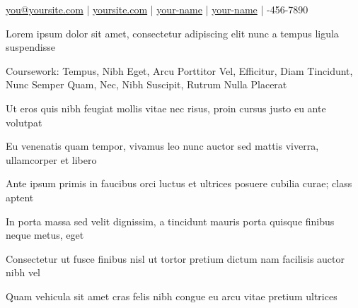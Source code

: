 \documentclass{resume-template}
\begin{document}

\begin{icons}
 \href{mailto:you@yoursite.com}{you@yoursite.com} | 
 \href{https://yoursite.com}{yoursite.com} |
 \href{https://linkedin.com/in/your-name/}{your-name} |
 \href{https://github.com/your-name}{your-name} |
-456-7890
\end{icons}



\begin{bullets}
\item Lorem ipsum dolor sit amet, consectetur adipiscing elit nunc a tempus ligula suspendisse
\item Coursework: Tempus, Nibh Eget, Arcu Porttitor Vel, Efficitur, Diam Tincidunt, Nunc Semper Quam, Nec, Nibh Suscipit, Rutrum Nulla Placerat
\end{bullets}



\begin{bullets}
\item Ut eros quis nibh feugiat mollis vitae nec risus, proin cursus justo eu ante volutpat
\item Eu venenatis quam tempor, vivamus leo nunc auctor sed mattis viverra, ullamcorper et libero
\item Ante ipsum primis in faucibus orci luctus et ultrices posuere cubilia curae; class aptent
\end{bullets}


\begin{bullets}
\item In porta massa sed velit dignissim, a tincidunt mauris porta quisque finibus neque metus, eget
\item Consectetur ut fusce finibus nisl ut tortor pretium dictum nam facilisis auctor nibh vel
\item Quam vehicula sit amet cras felis nibh congue eu arcu vitae pretium ultrices
\end{bullets}
\end{document}
